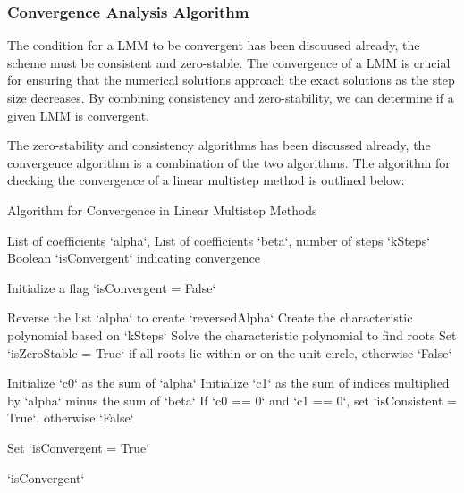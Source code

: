 \subsubsection{Convergence Analysis Algorithm}
The condition for a LMM to be convergent has been discuused already, the scheme must be consistent and zero-stable. The convergence of a LMM is crucial for ensuring that the numerical solutions approach the exact solutions as the step size decreases. By combining consistency and zero-stability, we can determine if a given LMM is convergent.

The zero-stability and consistency algorithms has been discussed already, the convergence algorithm is a combination of the two algorithms. The algorithm for checking the convergence of a linear multistep method is outlined below:

\begin{algorithm}
   \caption{Algorithm for Convergence in Linear Multistep Methods}
   \label{alg:convergence}
   
   \begin{algorithmic}[1] %
   
   \REQUIRE List of coefficients `alpha`, List of coefficients `beta`, number of steps `kSteps`
   \ENSURE Boolean `isConvergent` indicating convergence
   
   \STATE Initialize a flag `isConvergent = False`
   
   \STATE Reverse the list `alpha` to create `reversedAlpha`
   \STATE Create the characteristic polynomial based on `kSteps`
   \STATE Solve the characteristic polynomial to find roots
   \STATE Set `isZeroStable = True` if all roots lie within or on the unit circle, otherwise `False`
   
   \STATE Initialize `c0` as the sum of `alpha`
   \STATE Initialize `c1` as the sum of indices multiplied by `alpha` minus the sum of `beta`
   \STATE If `c0 == 0` and `c1 == 0`, set `isConsistent = True`, otherwise `False`
   
       \STATE Set `isConvergent = True`
   \ENDIF
   
   \RETURN `isConvergent`
   
   \end{algorithmic}
   \end{algorithm}



